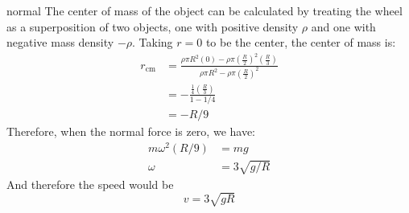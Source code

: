 \begin{solution}{normal}
The center of mass of the object can be calculated by treating the wheel as a superposition of two objects, one with positive density $\rho$ and one with negative mass density $-\rho$. Taking $r=0$ to be the center, the center of mass is:
\begin{align*}
r_\text{cm} &= \frac{\rho \pi R^2 (0) - \rho \pi \left(\frac{R}{2}\right)^2 \left(\frac{R}{3}\right)}{\rho\pi R^2 - \rho \pi\left(\frac{R}{2}\right)^2} \\
&= -\frac{\frac{1}{4} \left(\frac{R}{3}\right)}{1 - 1/4} \\
&= -R/9
\end{align*}
Therefore, when the normal force is zero, we have:
\begin{align*}
m\omega^2 (R/9) &= mg\\
\omega &= 3\sqrt{g/R}
\end{align*}And therefore the speed would be
$$\boxed{v = 3\sqrt{gR}}$$
\end{solution}
